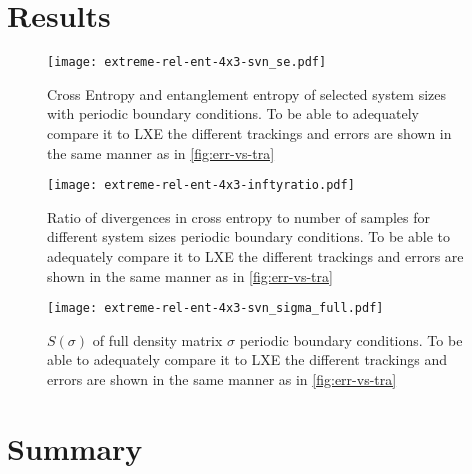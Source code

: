\section{Results}
\begin{figure}[h]
  \centering
  \texttt{[image: extreme-rel-ent-4x3-svn\_se.pdf]}
  \caption{Cross Entropy and entanglement entropy of selected system sizes with
  periodic boundary conditions. To be able to adequately compare it to LXE the
different trackings and errors are shown in the same manner as in
\cref{fig:err-vs-tra}}
  \label{fig:max_mix-svn_se-4x3}
\end{figure}
\begin{figure}[h]
  \centering
  \texttt{[image: extreme-rel-ent-4x3-inftyratio.pdf]}
  \caption{Ratio of divergences in cross entropy to number of samples for
    different system sizes
  periodic boundary conditions. To be able to adequately compare it to LXE the
different trackings and errors are shown in the same manner as in
\cref{fig:err-vs-tra}}
  \label{fig:max_mix-inftyratio-4x3}
\end{figure}
\begin{figure}[h]
  \centering
  \texttt{[image: extreme-rel-ent-4x3-svn\_sigma\_full.pdf]}
  \caption{$S(\sigma)$ of full density matrix $\sigma$ 
  periodic boundary conditions. To be able to adequately compare it to LXE the
different trackings and errors are shown in the same manner as in
\cref{fig:err-vs-tra}}
  \label{fig:max_mix-inftyratio-4x3}
\end{figure}
\section{Summary}

\clearpage
